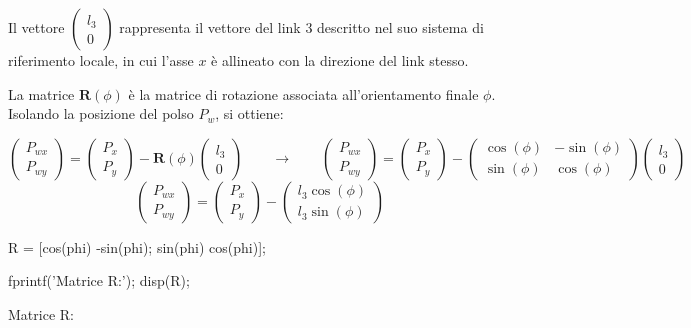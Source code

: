 \documentclass[11pt, a4paper]{article}
\begin{document}
\begin{par}
\begin{flushleft}
Il vettore $\left(\begin{array}{c}
l_3 \\
0
\end{array}\right)$ rappresenta il vettore del link $3$ descritto nel suo sistema di riferimento locale, in cui l'asse $x$ è allineato con la direzione del link stesso.
\end{flushleft}
\end{par}
\newpage
\begin{par}
\begin{flushleft}
La matrice $\mathbf{R}(\phi )$ è la matrice di rotazione associata all'orientamento finale $\phi$. Isolando la posizione del polso $P_w$, si ottiene:
\end{flushleft}
\end{par}
\[
    \begin{pmatrix}
        P_{wx} \\
        P_{wy}
    \end{pmatrix}
    =
    \begin{pmatrix}
        P_x \\
        P_y
    \end{pmatrix}
    - \mathbf{R}(\phi )
    \begin{pmatrix}
        l_{3}\\
        0
    \end{pmatrix}
    \qquad\longrightarrow\qquad
    \begin{pmatrix}
        P_{wx} \\
        P_{wy}
    \end{pmatrix}
    =
    \begin{pmatrix}
        P_x \\
        P_y
    \end{pmatrix}
    -
    \begin{pmatrix}
        \cos(\phi) & -\sin(\phi) \\
        \sin(\phi) & \cos(\phi)
    \end{pmatrix}
    \begin{pmatrix}
        l_{3}\\
        0
    \end{pmatrix}
\]
\[
    \begin{pmatrix}
        P_{wx} \\
        P_{wy}
    \end{pmatrix}
    =
    \begin{pmatrix}
        P_x \\
        P_y
    \end{pmatrix}
    -
    \begin{pmatrix}
        l_{3}\cos(\phi)\\
        l_{3}\sin(\phi)
    \end{pmatrix}
\]
\begin{matlabcode}
R = [cos(phi) -sin(phi); sin(phi) cos(phi)];

fprintf('Matrice R:\n');
disp(R);
\end{matlabcode}
\begin{matlaboutput}
Matrice R:
\end{matlaboutput}
\end{document}
